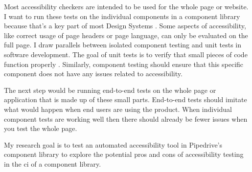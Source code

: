 \documentclass{master_thesis}
\begin{document}
Most accessibility checkers are intended to be used for the whole page or website. I want to run these tests on the individual components in a component library because that's a key part of most Design Systems \citep{Yew2020}. Some aspects of accessibility, like correct usage of page headers or page language, can only be evaluated on the full page. I draw parallels between isolated component testing and unit tests in software development. The goal of unit tests is to verify that small pieces of code function properly \citep[p.60]{Humble2010}. Similarly, component testing should ensure that this specific component does not have any issues related to accessibility.

The next step would be running end-to-end tests on the whole page or application that is made up of these small parts. End-to-end tests should imitate what would happen when end users are using the product. When individual component tests are working well then there should already be fewer issues when you test the whole page.

My research goal is to test an automated accessibility tool in Pipedrive's component library to explore the potential pros and cons of accessibility testing in the \ac{ci} of a component library.




\end{document}
